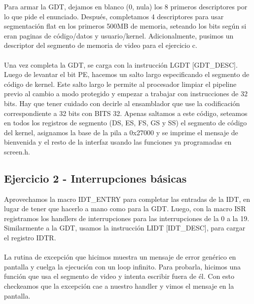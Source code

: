 \documentclass[10pt,a4paper,spanish]{article}
\begin{document}
Para armar la GDT, dejamos en blanco (0, nula) los 8 primeros descriptores por lo que pide el enunciado. Después, completamos 4 descriptores para usar segmentación flat en los primeros 500MB de memoria, seteando los bits según si eran paginas de código/datos y usuario/kernel. Adicionalmente, pusimos un descriptor del segmento de memoria de video para el ejercicio c.
\\ \\
Una vez completa la GDT, se carga con la instrucción LGDT [GDT\_DESC].
Luego de levantar el bit PE, hacemos un salto largo especificando el segmento de código de kernel. Este salto largo le permite al procesador limpiar el pipeline previo al cambio a modo protegido y empezar a trabajar con instrucciones de 32 bits. Hay que tener cuidado con decirle al ensamblador que use la codificación correspondiente a 32 bits con BITS 32.
Apenas saltamos a este código, seteamos en todos los registros de segmento (DS, ES, FS, GS y SS) el segmento de código del kernel, asignamos la base de la pila a 0x27000 y se imprime el mensaje de bienvenida y el resto de la interfaz usando las funciones ya programadas en screen.h.

\subsection{Ejercicio 2 - Interrupciones básicas}
Aprovechamos la macro IDT\_ENTRY para completar las entradas de la IDT, en lugar de tener que hacerlo a mano como para la GDT. Luego, con la macro ISR registramos los handlers de interrupciones para las interrupciones de la 0 a la 19.
Similarmente a la GDT, usamos la instrucción LIDT [IDT\_DESC], para cargar el registro IDTR.
\\ \\
La rutina de excepción que hicimos muestra un mensaje de error genérico en pantalla y cuelga la ejecución con un loop infinito. Para probarla, hicimos una función que usa el segmento de video y intenta escribir fuera de él. Con esto checkeamos que la excepción cae a nuestro handler y vimos el mensaje en la pantalla.
\end{document}
